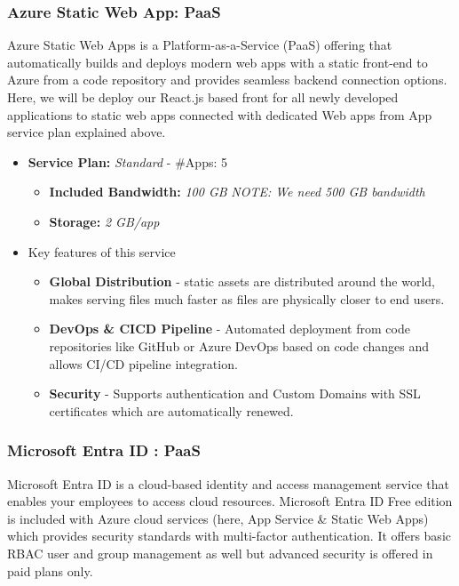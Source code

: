 \documentclass{llncs}
\begin{document}
\subsubsection{Azure Static Web App: PaaS} \leavevmode\newline
Azure Static Web Apps is a Platform-as-a-Service (PaaS) offering that automatically builds and deploys modern web apps with a static front-end to Azure from a code repository and provides seamless backend connection options.
Here, we will be deploy our React.js based front for all newly developed applications to static web apps connected with dedicated Web apps from App service plan explained above.
\begin{itemize}
    \item \textbf{Service Plan:} \textit{Standard} - \#Apps: 5

          \begin{itemize}
              \item \textbf{Included Bandwidth:} \textit{100 GB}
                    \textit{NOTE: We need 500 GB bandwidth}
              \item \textbf{Storage:} \textit{2 GB/app}
          \end{itemize}
          
        \item Key features of this service
          \begin{itemize}
              \item \textbf{Global Distribution} - static assets are distributed around the world, makes serving files much faster as files are physically closer to end users.
              \item \textbf{DevOps \& CICD Pipeline} - Automated deployment from code repositories like GitHub or Azure DevOps based on code changes and allows CI/CD pipeline integration.
              \item \textbf{Security} - Supports authentication and Custom Domains with SSL certificates which are automatically renewed.
          \end{itemize}
\end{itemize}


\subsubsection{Microsoft Entra ID : PaaS} \leavevmode\newline
Microsoft Entra ID is a cloud-based identity and access management service that enables your employees to access cloud resources. Microsoft Entra ID Free edition is included with Azure cloud services (here, App Service \& Static Web Apps) which
provides security standards with multi-factor authentication.
It offers basic RBAC user and group management as well but advanced security is offered in paid plans only.
\end{document}
